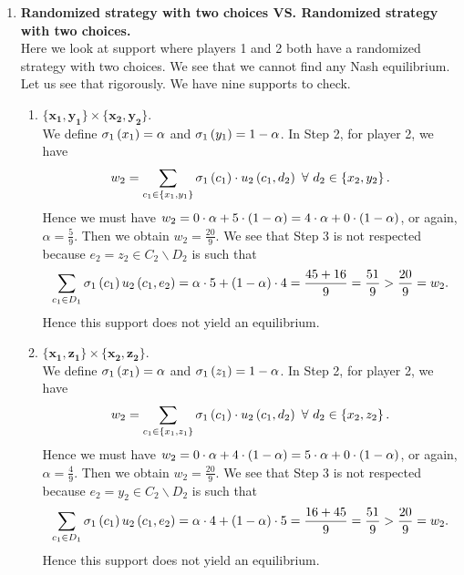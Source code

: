 \begin{enumerate} [label=\Alph*. ]
do not give an equilibrium.

\item \textbf{Randomized strategy with two choices VS. Randomized strategy with two choices.} \\
Here we look at support where players 1 and 2 both have a randomized strategy with two choices. We see that we cannot find any Nash equilibrium. Let us see that rigorously. We have nine supports to check.

\begin{enumerate} [label*= (\arabic*)]
    \item $\mathbf{\{x_1, y_1\}} \times \mathbf{\{x_2, y_2\}}$. \\
    We define $\sigma_{1} \left(x_1\right) = \alpha$ and $\sigma_{1} \left(y_1\right) = 1 - \alpha$. In Step 2, for player 2, we have
    \begin{equation*}
        w_2 = \sum_{c_1 \in \left\{x_1, y_1\right\}} \sigma_{1} \left(c_1\right) \cdot u_2 \left(c_1, d_2\right) \ \forall \ d_2 \in \left\{x_2, y_2\right\}.
    \end{equation*}
    Hence we must have $w_2 = 0 \cdot \alpha + 5 \cdot \left(1 - \alpha\right) = 4 \cdot \alpha + 0 \cdot \left(1 - \alpha\right)$, or again, $\alpha = \frac{5}{9}$. Then we obtain $w_2 = \frac{20}{9}$. We see that Step 3 is not respected because $e_2 = z_2 \in C_2 \backslash D_2$ is such that 
    \begin{equation*}
        \sum_{c_{1} \in D_{1}} \sigma_{1} \left(c_1\right) u_2 \left(c_{1}, e_2\right)
        = \alpha \cdot 5 + \left(1 - \alpha\right) \cdot 4
        = \dfrac{45 + 16}{9}
        = \dfrac{51}{9}
        > \dfrac{20}{9}
        = w_2.
    \end{equation*}
    Hence this support does not yield an equilibrium.

    
    \item $\mathbf{\{x_1, z_1\}} \times \mathbf{\{x_2, z_2\}}$. \\
    We define $\sigma_{1} \left(x_1\right) = \alpha$ and $\sigma_{1} \left(z_1\right) = 1 - \alpha$. In Step 2, for player 2, we have
    \begin{equation*}
        w_2 = \sum_{c_1 \in \left\{x_1, z_1\right\}} \sigma_{1} \left(c_1\right) \cdot u_2 \left(c_1, d_2\right) \ \forall \ d_2 \in \left\{x_2, z_2\right\}.
    \end{equation*}
    Hence we must have $w_2 = 0 \cdot \alpha + 4 \cdot \left(1 - \alpha\right) = 5 \cdot \alpha + 0 \cdot \left(1 - \alpha\right)$, or again, $\alpha = \frac{4}{9}$. Then we obtain $w_2 = \frac{20}{9}$. We see that Step 3 is not respected because $e_2 = y_2 \in C_2 \backslash D_2$ is such that 
    \begin{equation*}
        \sum_{c_{1} \in D_{1}} \sigma_{1} \left(c_1\right) u_2 \left(c_{1}, e_2\right)
        = \alpha \cdot 4 + \left(1 - \alpha\right) \cdot 5
        = \dfrac{16 + 45}{9}
        = \dfrac{51}{9}
        > \dfrac{20}{9}
        = w_2.
    \end{equation*}
    Hence this support does not yield an equilibrium.
    

\end{enumerate}
\end{enumerate}
